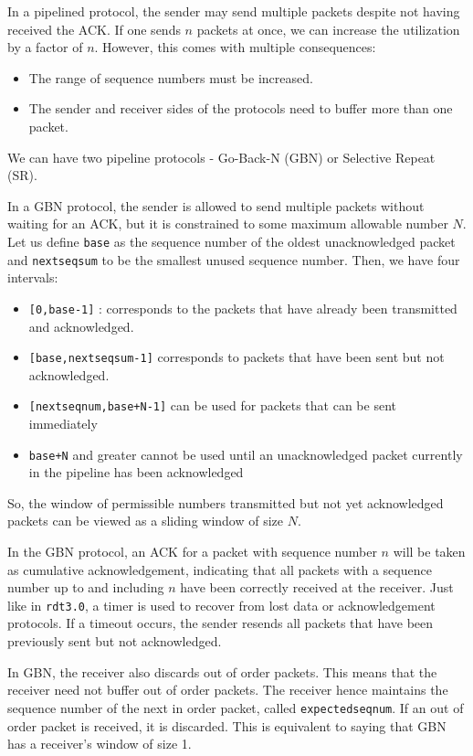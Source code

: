 \documentclass[12pt,letterpaper]{book}
\theoremstyle{definition}
\begin{document}
In a pipelined protocol, the sender may send multiple packets despite not having received the ACK. If one sends $n$ packets at once, we can increase the utilization by a factor of $n$. However, this comes with multiple consequences:

\begin{itemize}
  \item The range of sequence numbers must be increased.
  \item The sender and receiver sides of the protocols need to buffer more than one packet.
\end{itemize}

We can have two pipeline protocols - Go-Back-N (GBN) or Selective Repeat (SR).

In a GBN protocol, the sender is  allowed to send multiple packets without waiting for an ACK, but it is constrained to some maximum allowable number $N$. Let us define \texttt{base} as the sequence number of the oldest unacknowledged packet and \texttt{nextseqsum} to be the smallest unused sequence number. Then, we have four intervals:

\begin{itemize}
  \item \texttt{[0,base-1]} : corresponds to the packets that have already been transmitted and acknowledged.
  \item \texttt{[base,nextseqsum-1]} corresponds to packets that have been sent but not acknowledged.
  \item \texttt{[nextseqnum,base+N-1]} can be used for packets that can be sent immediately
  \item \texttt{base+N} and greater cannot be used until an unacknowledged packet currently in the pipeline has been acknowledged
\end{itemize}

So, the window of permissible numbers transmitted but not yet acknowledged packets can be viewed as a sliding window of size $N$.

In the GBN protocol, an ACK for a packet with sequence number $n$ will be taken as cumulative acknowledgement, indicating that all packets with a sequence number up to and including $n$ have been correctly received at the receiver. Just like in \texttt{rdt3.0}, a timer is used to recover from lost data or acknowledgement protocols. If a timeout occurs, the sender resends all packets that have been previously sent but not acknowledged.

In GBN, the receiver also discards out of order packets. This means that the receiver need not buffer out of order packets. The receiver hence maintains the sequence number of the next in order packet, called \texttt{expectedseqnum}. If an out of order packet is received, it is discarded. This is equivalent to saying that GBN has a receiver's window of size 1.
\end{document}
